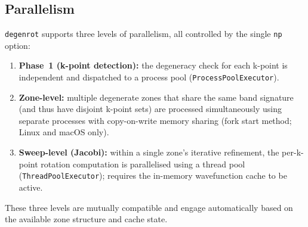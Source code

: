 \documentclass[a4paper,12pt]{report}
\begin{document}
\subsection*{Parallelism}

\texttt{degenrot} supports three levels of parallelism, all controlled by the
single \texttt{np} option:

\begin{enumerate}
  \item \textbf{Phase~1 (k-point detection):} the degeneracy check for each
        k-point is independent and dispatched to a process pool
        (\texttt{ProcessPoolExecutor}).

  \item \textbf{Zone-level:} multiple degenerate zones that share the same
        band signature (and thus have disjoint k-point sets) are processed
        simultaneously using separate processes with copy-on-write memory
        sharing (fork start method; Linux and macOS only).

  \item \textbf{Sweep-level (Jacobi):} within a single zone's iterative
        refinement, the per-k-point rotation computation is parallelised
        using a thread pool (\texttt{ThreadPoolExecutor}); requires the
        in-memory wavefunction cache to be active.
\end{enumerate}

These three levels are mutually compatible and engage automatically based on
the available zone structure and cache state.

%
%
%
%
\end{document}
